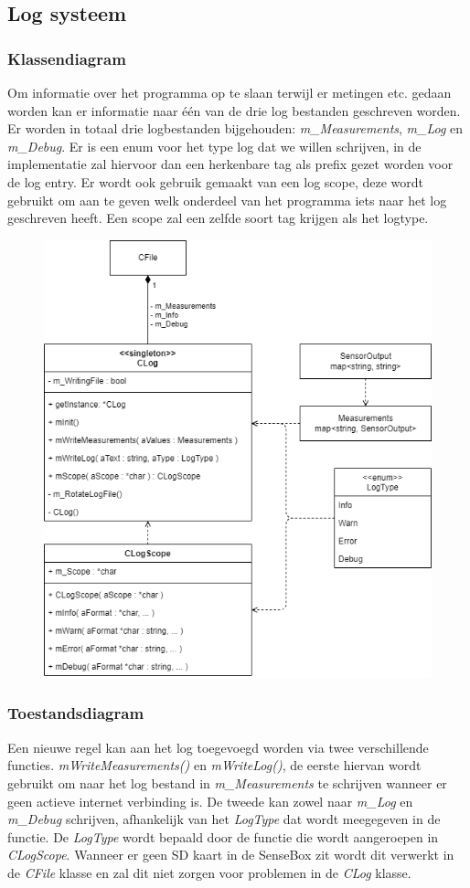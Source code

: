 \newpage
\subsection{Log systeem}
\subsubsection{Klassendiagram}
Om informatie over het programma op te slaan terwijl er metingen etc. gedaan worden kan er informatie naar één van de drie log bestanden geschreven worden. Er worden in totaal drie logbestanden bijgehouden: \emph{m\_Measurements}, \emph{m\_Log} en \emph{m\_Debug}. Er is een enum voor het type log dat we willen schrijven, in de implementatie zal hiervoor dan een herkenbare tag als prefix gezet worden voor de log entry. Er wordt ook gebruik gemaakt van een log scope, deze wordt gebruikt om aan te geven welk onderdeel van het programma iets naar het log geschreven heeft. Een scope zal een zelfde soort tag krijgen als het logtype.

\begin{figure}[H]
  \centering
  \includegraphics[width=.7\columnwidth]{uml/logger-abstraction.png}
\end{figure}

\newpage
\subsubsection{Toestandsdiagram}
Een nieuwe regel kan aan het log toegevoegd worden via twee verschillende functies. \emph{mWriteMeasurements()} en \emph{mWriteLog()}, de eerste hiervan wordt gebruikt om naar het log bestand in \emph{m\_Measurements} te schrijven wanneer er geen actieve internet verbinding is. De tweede kan zowel naar \emph{m\_Log} en \emph{m\_Debug} schrijven, afhankelijk van het \emph{LogType} dat wordt meegegeven in de functie. De \emph{LogType} wordt bepaald door de functie die wordt aangeroepen in \emph{CLogScope}.
\vspace{1em}
Wanneer er geen SD kaart in de SenseBox zit wordt dit verwerkt in de \emph{CFile} klasse en zal dit niet zorgen voor problemen in de \emph{CLog} klasse.

